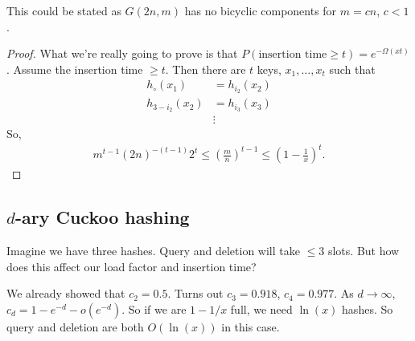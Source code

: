 \documentclass{report}
\begin{document}
\noindent This could be stated as $G(2n,m)$ has no bicyclic components for $m = cn$, $c < 1$. 
\begin{proof}
    What we're really going to prove is that $P(\text{insertion time} \geq t) = e^{-\Omega(xt)}$. Assume the insertion time $\geq t$. Then there are $t$ keys, $x_1, \ldots, x_t$ such that 
    \begin{align*}
        h_\circ(x_1) &= h_{i_2}(x_2) \\
        h_{3 - i_2}(x_2) &= h_{i_3}(x_3) \\
        &\vdots
    \end{align*}
    So,
    \begin{align*}
        m^{t-1}(2n)^{-(t-1)} 2^t \leq \left(\frac mn\right)^{t-1} \leq \left(1 - \frac 1x\right)^t.
    \end{align*}
\end{proof}
\newpage
{}
\subsection{$d$-ary Cuckoo hashing}
Imagine we have three hashes. Query and deletion will take $\leq 3$ slots. But how does this affect our load factor and insertion time?

\noindent We already showed that $c_2 = 0.5$. Turns out $c_3 = 0.918$, $c_4 = 0.977$. As $d\to\infty$, $c_d = 1 - e^{-d} - o(e^{-d})$. So if we are $1- 1/x$ full, we need $\ln(x)$ hashes. So query and deletion are both $O(\ln(x))$ in this case.

\end{document}

